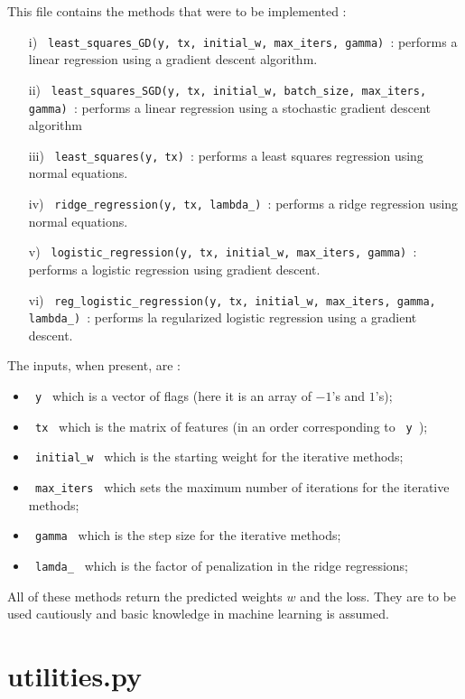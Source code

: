 \documentclass[11pt, oneside]{article}   	%
\begin{document}
This file contains the methods that were to be implemented : 
\begin{itemize}
\item[i)] \lstinline" least_squares_GD(y, tx, initial_w, max_iters, gamma) ": performs a linear regression using a gradient descent algorithm. 
\item[ii)] \lstinline" least_squares_SGD(y, tx, initial_w, batch_size, max_iters, gamma) ": performs a linear regression using a stochastic gradient descent algorithm 

\item[iii)] \lstinline" least_squares(y, tx) ": performs a least squares regression using normal equations.
\item[iv)] \lstinline" ridge_regression(y, tx, lambda_) ": performs a ridge regression using normal equations.
\item[v)] \lstinline" logistic_regression(y, tx, initial_w, max_iters, gamma) ": performs a logistic regression using gradient descent.
\item[vi)] \lstinline" reg_logistic_regression(y, tx, initial_w, max_iters, gamma, lambda_) ": performs la regularized logistic regression using a gradient descent.
\end{itemize}
The inputs, when present, are : 
\begin{itemize}
\item \lstinline" y " which is a vector of flags (here it is an array of $-1$'s and $1$'s); 
\item \lstinline" tx " which is the matrix of features (in an order corresponding to \lstinline" y ");
\item \lstinline" initial_w " which is the starting weight for the iterative methods;
\item \lstinline" max_iters " which sets the maximum number of iterations for the iterative methods;
\item \lstinline" gamma " which is the step size for the iterative methods;
\item \lstinline" lamda_ " which is the factor of penalization in the ridge regressions;
\end{itemize}

All of these methods return the predicted weights $w$ and the loss. They are to be used cautiously and basic knowledge in machine learning is assumed.

\section{utilities.py}
\end{document}
